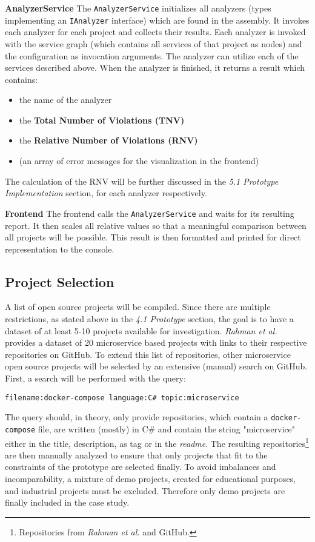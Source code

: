 \documentclass{article}
\begin{document}
\noindent\textbf{AnalyzerService}\newline
The \lstinline{AnalyzerService} initializes all analyzers (types implementing an \lstinline{IAnalyzer} interface) which are found in the assembly. It invokes each analyzer for each project and collects their results. Each analyzer is invoked with the service graph (which contains all services of that project as nodes) and the configuration as invocation arguments. The analyzer can utilize each of the services described above. When the analyzer is finished, it returns a result which contains:
\begin{itemize}
    \item the name of the analyzer
    \item the \textbf{Total Number of Violations (TNV)}
    \item the \textbf{Relative Number of Violations (RNV)}
    \item (an array of error messages for the visualization in the frontend)
\end{itemize}
The calculation of the RNV will be further discussed in the \textit{5.1 Prototype Implementation} section, for each analyzer respectively. \newline

\noindent\textbf{Frontend}\newline
The frontend calls the \lstinline{AnalyzerService} and waits for its resulting report. It then scales all relative values so that a meaningful comparison between all projects will be possible. This result is then formatted and printed for direct representation to the console.

\subsection{Project Selection}
A list of open source projects will be compiled. Since there are multiple restrictions, as stated above in the \textit{4.1 Prototype} section, the goal is to have a dataset of at least 5-10 projects available for investigation. \textit{Rahman et al.} \cite{imranur_curated_2019} provides a dataset of 20 microservice based projects with links to their respective repositories on GitHub. To extend this list of repositories, other microservice open source projects will be selected by an extensive (manual) search on GitHub. 
First, a search will be performed with the query:
\begin{lstlisting}
filename:docker-compose language:C# topic:microservice
\end{lstlisting}
The query should, in theory, only provide repositories, which contain a \lstinline{docker-compose} file, are written (mostly) in C\# and contain the string "microservice" either in the title, description, as tag or in the \textit{readme}. The resulting repositories\footnote{Repositories from \textit{Rahman et al.} and GitHub.} are then manually analyzed to ensure that only projects that fit to the constraints of the prototype are selected finally.
To avoid imbalances and incomparability, a mixture of demo projects, created for educational purposes, and industrial projects must be excluded. Therefore only demo projects are finally included in the case study.
\end{document}
